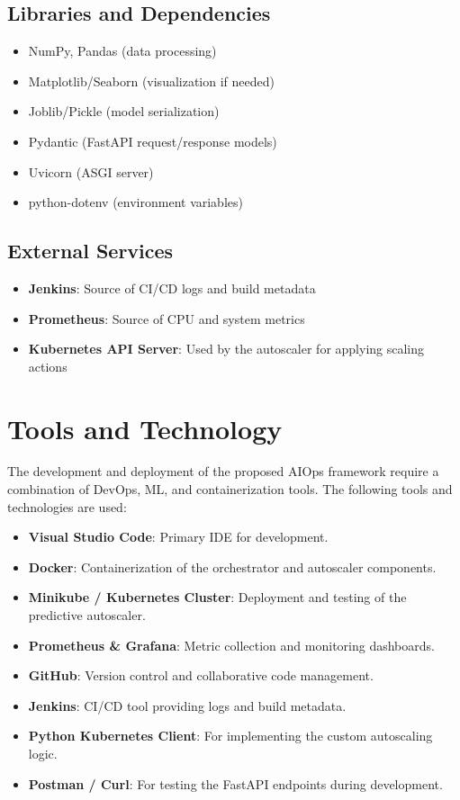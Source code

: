 \documentclass[12pt]{report}
\begin{document}
\subsection*{Libraries and Dependencies}
\begin{itemize}
    \item NumPy, Pandas (data processing)
    \item Matplotlib/Seaborn (visualization if needed)
    \item Joblib/Pickle (model serialization)
    \item Pydantic (FastAPI request/response models)
    \item Uvicorn (ASGI server)
    \item python-dotenv (environment variables)
\end{itemize}

\subsection*{External Services}
\begin{itemize}
    \item \textbf{Jenkins}: Source of CI/CD logs and build metadata
    \item \textbf{Prometheus}: Source of CPU and system metrics
    \item \textbf{Kubernetes API Server}: Used by the autoscaler for applying scaling actions
\end{itemize}

\section{Tools and Technology}

The development and deployment of the proposed AIOps framework require a combination of DevOps, ML, and containerization tools. The following tools and technologies are used:

\begin{itemize}
    \item \textbf{Visual Studio Code}: Primary IDE for development.
    \item \textbf{Docker}: Containerization of the orchestrator and autoscaler components.
    \item \textbf{Minikube / Kubernetes Cluster}: Deployment and testing of the predictive autoscaler.
    \item \textbf{Prometheus \& Grafana}: Metric collection and monitoring dashboards.
    \item \textbf{GitHub}: Version control and collaborative code management.
    \item \textbf{Jenkins}: CI/CD tool providing logs and build metadata.
    \item \textbf{Python Kubernetes Client}: For implementing the custom autoscaling logic.
    \item \textbf{Postman / Curl}: For testing the FastAPI endpoints during development.
\end{itemize}
\end{document}
